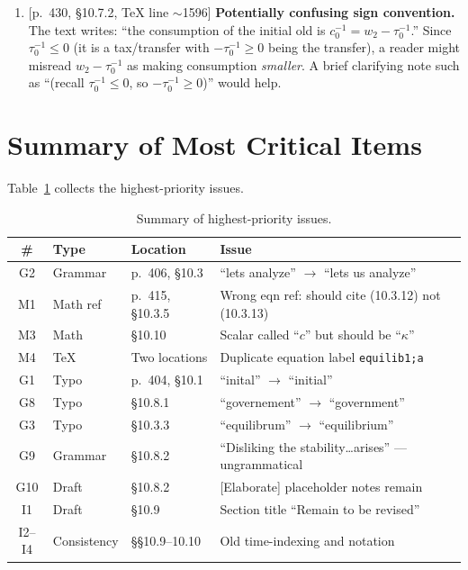 \documentclass[11pt]{article}
\newcommand{\loc}[1]{\textsf{\small [#1]}}
\begin{document}
\begin{enumerate}[label=\textbf{I\arabic*.}, leftmargin=2em]
\item \loc{p.~430, \S10.7.2, TeX line $\sim$1596}
\textbf{Potentially confusing sign convention.}\\
The text writes: ``the consumption of the initial old is $c^{-1}_0 = w_2 - \tau^{-1}_0$.''
Since $\tau^{-1}_0 \leq 0$ (it is a tax/transfer with $-\tau^{-1}_0 \geq 0$ being the transfer), a reader might misread $w_2 - \tau^{-1}_0$ as making consumption \emph{smaller}.
A brief clarifying note such as ``(recall $\tau^{-1}_0\leq 0$, so $-\tau^{-1}_0\geq 0$)'' would help.

\end{enumerate}


\section{Summary of Most Critical Items}

Table~\ref{tab:summary} collects the highest-priority issues.

\begin{table}[ht]
\centering
\small
\begin{tabular}{@{}clll@{}}
\toprule
\textbf{\#} & \textbf{Type} & \textbf{Location} & \textbf{Issue} \\
\midrule
G2  & Grammar   & p.~406, \S10.3   & ``lets analyze'' $\to$ ``lets us analyze'' \\
M1  & Math ref  & p.~415, \S10.3.5 & Wrong eqn ref: should cite (10.3.12) not (10.3.13) \\
M3  & Math      & \S10.10          & Scalar called ``$c$'' but should be ``$\kappa$'' \\
M4  & \TeX      & Two locations     & Duplicate equation label \texttt{equilib1;a} \\
G1  & Typo      & p.~404, \S10.1   & ``inital'' $\to$ ``initial'' \\
G8  & Typo      & \S10.8.1         & ``governement'' $\to$ ``government'' \\
G3  & Typo      & \S10.3.3         & ``equilibrum'' $\to$ ``equilibrium'' \\
G9  & Grammar   & \S10.8.2         & ``Disliking the stability\ldots arises'' --- ungrammatical \\
G10 & Draft     & \S10.8.2         & {[Elaborate]} placeholder notes remain \\
I1  & Draft     & \S10.9           & Section title ``Remain to be revised'' \\
I2--I4 & Consistency & \S\S10.9--10.10 & Old time-indexing and notation \\
\bottomrule
\end{tabular}
\caption{Summary of highest-priority issues.}
\label{tab:summary}
\end{table}
\end{document}
